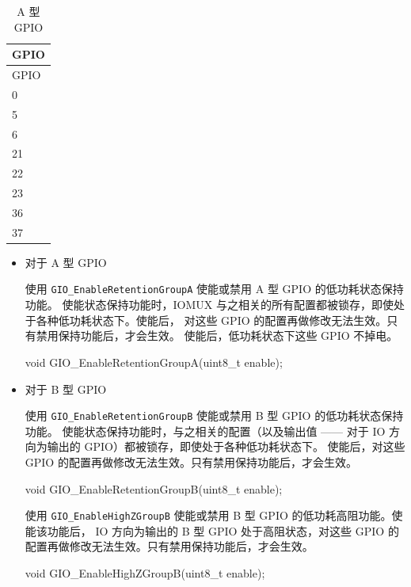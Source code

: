 \documentclass[
  12pt,
]{book}
\newenvironment{Shaded}{\begin{snugshade}}{\end{snugshade}}
\newcommand{\DataTypeTok}[1]{\textcolor[rgb]{0.13,0.29,0.53}{#1}}
\newcommand{\NormalTok}[1]{#1}
\begin{document}
\begin{longtable}[]{@{}l@{}}
\caption{\label{tab:ch-gpio-type-a} A 型 GPIO}\tabularnewline
\toprule
GPIO\tabularnewline
\midrule
\endfirsthead
\toprule
GPIO\tabularnewline
\midrule
\endhead
0\tabularnewline
5\tabularnewline
6\tabularnewline
21\tabularnewline
22\tabularnewline
23\tabularnewline
36\tabularnewline
37\tabularnewline
\bottomrule
\end{longtable}

\begin{itemize}
\item
  对于 A 型 GPIO

  使用 \texttt{GIO\_EnableRetentionGroupA} 使能或禁用 A 型 GPIO 的低功耗状态保持功能。
  使能状态保持功能时，IOMUX 与之相关的所有配置都被锁存，即使处于各种低功耗状态下。使能后，
  对这些 GPIO 的配置再做修改无法生效。只有禁用保持功能后，才会生效。
  使能后，低功耗状态下这些 GPIO 不掉电。

\begin{Shaded}
\begin{Highlighting}[]
\DataTypeTok{void}\NormalTok{ GIO_EnableRetentionGroupA(}\DataTypeTok{uint8_t}\NormalTok{ enable);}
\end{Highlighting}
\end{Shaded}
\item
  对于 B 型 GPIO

  使用 \texttt{GIO\_EnableRetentionGroupB} 使能或禁用 B 型 GPIO 的低功耗状态保持功能。
  使能状态保持功能时，与之相关的配置（以及输出值 ------ 对于 IO 方向为输出的 GPIO）都被锁存，即使处于各种低功耗状态下。
  使能后，对这些 GPIO 的配置再做修改无法生效。只有禁用保持功能后，才会生效。

\begin{Shaded}
\begin{Highlighting}[]
\DataTypeTok{void}\NormalTok{ GIO_EnableRetentionGroupB(}\DataTypeTok{uint8_t}\NormalTok{ enable);}
\end{Highlighting}
\end{Shaded}

  使用 \texttt{GIO\_EnableHighZGroupB} 使能或禁用 B 型 GPIO 的低功耗高阻功能。使能该功能后，
  IO 方向为输出的 B 型 GPIO 处于高阻状态，对这些 GPIO 的配置再做修改无法生效。只有禁用保持功能后，才会生效。

\begin{Shaded}
\begin{Highlighting}[]
\DataTypeTok{void}\NormalTok{ GIO_EnableHighZGroupB(}\DataTypeTok{uint8_t}\NormalTok{ enable);}
\end{Highlighting}
\end{Shaded}
\end{itemize}
\end{document}
